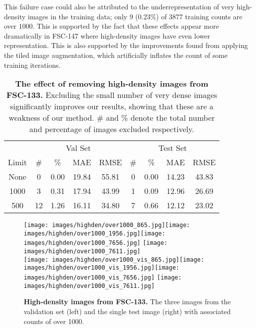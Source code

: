 \documentclass[letterpaper, 11pt]{IEEEtran}
\begin{document}
This failure case could also be attributed to the underrepresentation of very high-density images in the training data; only 9 (0.23\%) of 3877 training counts are over 1000. 
This is supported by the fact that these effects appear more dramatically in FSC-147 where high-density images have even lower representation.
This is also supported by the improvements found from applying the tiled image augmentation, which artificially inflates the count of some training iterations.
\begin{table}
    \centering
    \fontsize{9}{9}\selectfont
    \setlength\tabcolsep{0.5em}
\begin{tabular}{ccccccccc}
 \toprule
 &\multicolumn{4}{c}{Val Set} & \multicolumn{4}{c}{Test Set}   \\
  \cmidrule(r){2-5} \cmidrule(r){6-9} 
 Limit & \# & \% & MAE & RMSE  & \# & \% & MAE & RMSE\\
\midrule
None & 0 & 0.00 &19.84  & 55.81 & 0 & 0.00 & 14.23  & 43.83\\
1000 & 3 & 0.31 & 17.94 & 43.99 &  1 & 0.09 & 12.96 & 26.69\\
500 & 12 & 1.26 & 16.11 & 34.80 & 7 & 0.66 & 12.12 & 23.02\\
\bottomrule
\end{tabular}
     \caption{
    \textbf{The effect of removing high-density images from FSC-133.}
    Excluding the small number of very dense images significantly improves our results, showing that these are a weakness of our method.
    \# and \% denote the total number and percentage of images excluded respectively.
    }
    \label{FSC147_exclusions_table}
\end{table}
\begin{figure}
    \centering
    \fontsize{9}{9}\selectfont
    \texttt{[image: images/highden/over1000\_865.jpg]}\texttt{[image: images/highden/over1000\_1956.jpg]}\texttt{[image: images/highden/over1000\_7656.jpg]}
\texttt{[image: images/highden/over1000\_7611.jpg]}     
\\\vspace{-0.15em}
\texttt{[image: images/highden/over1000\_vis\_865.jpg]}\texttt{[image: images/highden/over1000\_vis\_1956.jpg]}\texttt{[image: images/highden/over1000\_vis\_7656.jpg]}    
\texttt{[image: images/highden/over1000\_vis\_7611.jpg]}    
\\\vspace{-0.1em}

     \caption{\textbf{High-density images from FSC-133.} The three images from the validation set (left) and the single test image (right) with associated counts of over 1000. 
    }
    \label{FSC147_exclusions_figure}
\end{figure}
\end{document}
